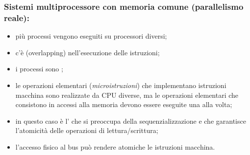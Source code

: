 \subsubsection{Sistemi multiprocessore con memoria comune (parallelismo reale):}

\begin{itemize}
  \item più processi vengono eseguiti  su processori diversi;
  \item c'è  (overlapping) nell'esecuzione delle istruzioni;
  \item i processi sono ;
  \item le operazioni elementari (\textit{microistruzioni}) che implementano istruzioni macchina sono realizzate da CPU diverse, ma le operazioni elementari che consistono in accessi alla memoria devono essere eseguite una alla volta;
  \item in questo caso è l' che si preoccupa della sequenzializzazione e che garantisce l'atomicità delle operazioni di lettura/scrittura;
  \item l'accesso fisico al bus può rendere atomiche le istruzioni macchina.
\end{itemize}





